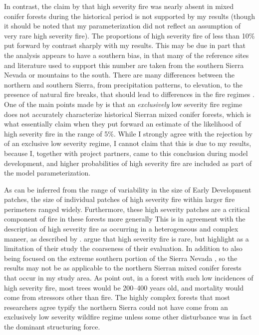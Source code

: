 In contrast, the claim by \citet{Collins2011} that high severity fire was nearly absent in mixed conifer forests during the historical period is not supported by my results (though it should be noted that my parameterization did not reflect an assumption of very rare high severity fire). The proportions of high severity fire of less than 10\% put forward by \citet{Mallek2013} contrast sharply with my results. This may be due in part that the \citet{Mallek2013} analysis appears to have a southern bias, in that many of the reference sites and literature used to support this number are taken from the southern Sierra Nevada or mountains to the south. There are many differences between the northern and southern Sierra, from precipitation patterns, to elevation, to the presence of natural fire breaks, that should lead to differences in the fire regimes \citep{Stephens2015}. One of the main points made by \citet{Baker2014} is that an \emph{exclusively} low severity fire regime does not accurately characterize historical Sierran mixed conifer forests, which is what \citet{Mallek2013} essentially claim when they put forward an estimate of the likelihood of high severity fire in the range of 5\%. While I strongly agree with the rejection by \citet{Baker2014} of an exclusive low severity regime, I cannot claim that this is due to my results, because I, together with project partners, came to this conclusion during model development, and higher probabilities of high severity fire are included as part of the model parameterization.

As can be inferred from the range of variability in the size of Early Development patches, the size of individual patches of high severity fire within larger fire perimeters ranged widely. Furthermore, these high severity patches are a critical component of fire in these forests more generally \citep{Collins2010} This is in agreement with the description of high severity fire as occurring in a heterogeneous and complex maneer, as described by \citet{Keeley2000,Hessburg2005,Collins2010,Baker2014}. \citet{Stephens2015} argue that high severity fire is rare, but highlight as a limitation of their study the coarseness of their evaluation. In addition to also being focused on the extreme southern portion of the Sierra Nevada \citep{Stephens2015}, so the results may not be as applicable to the northern Sierran mixed conifer forests that occur in my study area. As \citet{Stephens2015} point out, in a forest with such low incidences of high severity fire, most trees would be 200--400 years old, and mortality would come from stressors other than fire. The highly complex forests that most researchers agree typify the northern Sierra \citep{Chang1995} could not have come from an exclusively low severity wildfire regime unless some other disturbance was in fact the dominant structuring force.

